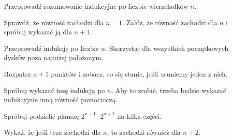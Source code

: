 \newpage
{}

\begin{hints_list}
	\item Przeprowadź rozumowanie indukcyjne po liczbie wierzchołków $n$.

	\item Sprawdź, że równość zachodzi dla $n = 1$. Załóż, że równość zachodzi dla $n$ i spróbuj wykazać ją dla $n + 1$.

	\item Przeprowadź indukcję po liczbie $n$. Skorzystaj dla wszystkich początkowych dysków poza najniżej położonym.

	\item Rozpatrz $n + 1$ punktów i zobacz, co się stanie, jeśli usuniemy jeden z nich.

	\item Spróbuj wykazać tezę indukcją po $n$. Aby to zrobić, trzeba będzie wykazać indukcyjnie inną równość pomocniczą.

	\item Spróbuj podzielić planszę $2^{n + 1} \cdot 2^{n + 1}$ na kilka części.

	\item Wykaż, że jeśli teza zachodzi dla $n$, to zachodzi również dla $n + 2$.
\end{hints_list}